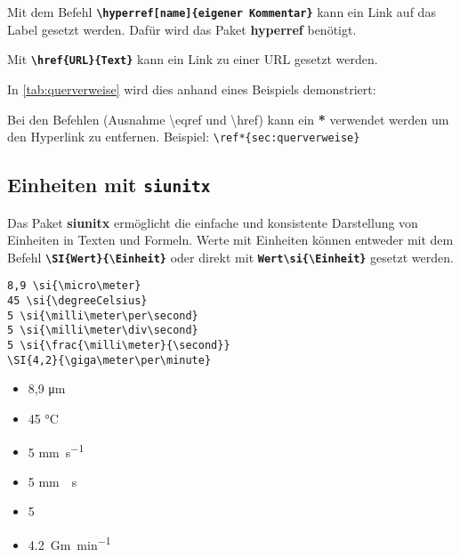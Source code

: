 Mit dem Befehl \textbf{\texttt{\textbackslash hyperref[name]\{eigener Kommentar\}}} kann ein Link auf das Label gesetzt werden. Dafür wird das Paket \textbf{hyperref} benötigt.

Mit \textbf{\texttt{\textbackslash href\{URL\}\{Text\}}} kann ein Link zu einer URL gesetzt werden.

In \autoref{tab:querverweise} wird dies anhand eines Beispiels demonstriert:


Bei den Befehlen (Ausnahme \textbackslash eqref und \textbackslash href) kann ein \textbf{*} verwendet werden um den Hyperlink zu entfernen. Beispiel: \texttt{\textbackslash ref*\{sec:querverweise\}}

\subsection{Einheiten mit \texttt{siunitx}}

Das Paket \textbf{siunitx} ermöglicht die einfache und konsistente Darstellung von Einheiten in Texten und Formeln.
Werte mit Einheiten können entweder mit dem Befehl \textbf{\texttt{\textbackslash SI\{Wert\}\{\textbackslash Einheit\}}} oder direkt mit \textbf{\texttt{Wert\textbackslash si\{\textbackslash Einheit\}}} gesetzt werden.

\begin{minipage}[c]{0.6\textwidth}
    \begin{lstlisting}[language={[LaTeX]TeX}, lineskip=2pt]
8,9 \si{\micro\meter}               
45 \si{\degreeCelsius}              
5 \si{\milli\meter\per\second}      
5 \si{\milli\meter\div\second}      
5 \si{\frac{\milli\meter}{\second}} 
\SI{4,2}{\giga\meter\per\minute}    
    \end{lstlisting}
\end{minipage}
\hfill
\begin{minipage}[c]{0.3\textwidth}
    \begin{itemize}[itemsep=2pt, label=$\rightarrow$]
        \item 8,9 \si{\micro\meter}
        \item 45 \si{\degreeCelsius}
        \item 5 \si{\milli\meter\per\second}
        \item 5 \si{\milli\meter\div\second}
        \item 5 \si{\frac{\milli\meter}{\second}}
        \item \SI{4,2}{\giga\meter\per\minute}
    \end{itemize}
\end{minipage}


